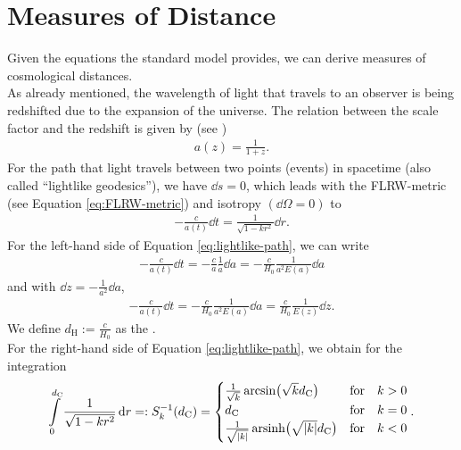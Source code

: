 \newpage
\section{Measures of Distance}

Given the equations the standard model provides, we can derive measures of cosmological distances. \\
As already mentioned, the wavelength of light that travels to an observer is being redshifted due to the expansion of the universe. The relation between the scale factor and the redshift is given by (see \cite[p.~9]{Bartelmann2019})
\begin{align}
    a(z) = \frac{1}{1 + z}. \label{eq:scale-factor-redshift-relation}
\end{align}
For the path that light travels between two points (events) in spacetime (also called ``lightlike geodesics''), we have $\dd{s} = 0$, which leads with the FLRW-metric (see Equation \eqref{eq:FLRW-metric}) and isotropy $(\dd{\Omega} = 0)$ to 
\begin{align}
    - \frac{c}{a(t)} \dd{t} = \frac{1}{\sqrt{1 - kr^2}} \dd{r}. \label{eq:lightlike-path} 
\end{align}
For the left-hand side of Equation \eqref{eq:lightlike-path}, we can write 
\begin{align}
    - \frac{c}{a(t)} \dd{t} = - \frac{c}{a} \frac{1}{\dot{a}} \dd{a} = - \frac{c}{H_{0}} \frac{1}{a^2 E(a)} \dd{a}
\end{align}
and with $\displaystyle \dd{z} = - \frac{1}{a^2} \dd{a}$, 
\begin{align}
    - \frac{c}{a(t)} \dd{t} = - \frac{c}{H_{0}} \frac{1}{a^2 E(a)} \dd{a} = \frac{c}{H_{0}} \frac{1}{E(z)} \dd{z}. \label{eq:RHS-lightlike-path}
\end{align}
We define $\displaystyle d_{\text{H}} := \frac{c}{H_{0}}$ as the . \\
For the right-hand side of Equation \eqref{eq:lightlike-path}, we obtain for the integration
\begin{align}
    \int\limits_{0}^{d_{\text{C}}} \frac{1}{\sqrt{1 - kr^2}} \dd{r} =: S^{-1}_{k}(d_{\text{C}}) = \begin{cases} \frac{1}{\sqrt{k}} \arcsin \bigl( \sqrt{k} d_{\text{C}} \bigr) &\text{for} \quad k > 0 \\ d_{\text{C}} &\text{for} \quad k = 0 \\ \frac{1}{\sqrt{\vert k \vert}} \operatorname{arsinh} \bigl(\sqrt{\vert k \vert} d_{\text{C}} \bigr) &\text{for} \quad k < 0 \end{cases}.
\end{align}
